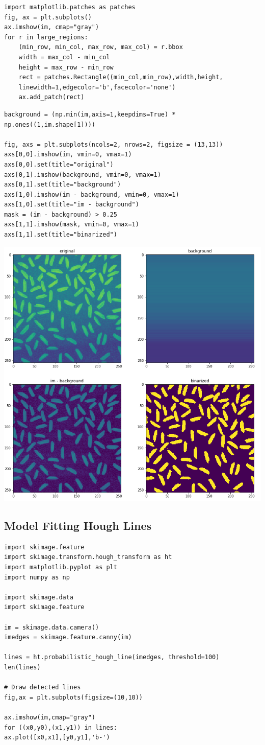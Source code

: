 \documentclass[x11names,11pt,a4paper]{article}
\theoremstyle{definition}
\begin{document}
\begin{verbatim}
import matplotlib.patches as patches
fig, ax = plt.subplots()
ax.imshow(im, cmap="gray")
for r in large_regions:
	(min_row, min_col, max_row, max_col) = r.bbox
	width = max_col - min_col
	height = max_row - min_row
	rect = patches.Rectangle((min_col,min_row),width,height,
	linewidth=1,edgecolor='b',facecolor='none')
	ax.add_patch(rect)
\end{verbatim}

\begin{verbatim}
background = (np.min(im,axis=1,keepdims=True) * np.ones((1,im.shape[1])))

fig, axs = plt.subplots(ncols=2, nrows=2, figsize = (13,13))
axs[0,0].imshow(im, vmin=0, vmax=1)
axs[0,0].set(title="original")
axs[0,1].imshow(background, vmin=0, vmax=1)
axs[0,1].set(title="background")
axs[1,0].imshow(im - background, vmin=0, vmax=1)
axs[1,0].set(title="im - background")
mask = (im - background) > 0.25
axs[1,1].imshow(mask, vmin=0, vmax=1)
axs[1,1].set(title="binarized")
\end{verbatim}
\begin{center}
	\includegraphics[width=0.7\linewidth]{img/BinarizedRiceGrains}
\end{center}

\subsection{Model Fitting Hough Lines}
\begin{verbatim}
import skimage.feature
import skimage.transform.hough_transform as ht
import matplotlib.pyplot as plt
import numpy as np

import skimage.data
import skimage.feature

im = skimage.data.camera()
imedges = skimage.feature.canny(im)

lines = ht.probabilistic_hough_line(imedges, threshold=100)
len(lines)

# Draw detected lines
fig,ax = plt.subplots(figsize=(10,10))

ax.imshow(im,cmap="gray")
for ((x0,y0),(x1,y1)) in lines:
ax.plot([x0,x1],[y0,y1],'b-')
\end{verbatim}
\end{document}
